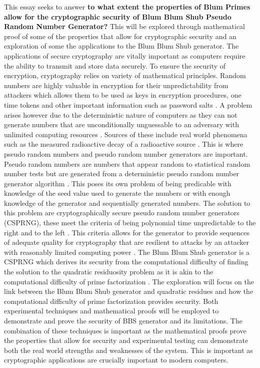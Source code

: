 \documentclass{article}
\begin{document}
This essay seeks to answer \textbf{to what extent the properties of Blum Primes allow for the cryptographic security of Blum Blum Shub Pseudo Random Number Generator?} This will be explored through mathematical proof of some of the properties that allow for cryptographic security and an exploration of some the applications to the Blum Blum Shub generator. The applications of secure cryptography are vitally important as computers require the ability to transmit and store data securely. To ensure the security of encryption, cryptography relies on variety of mathematical principles. Random numbers are highly valuable in encryption for their unpredictability from attackers which allows them to be used as keys in encryption procedures, one time tokens and other important information such as password salts \cite{design2010}. A problem arises however due to the deterministic nature of computers as they can not generate numbers that are unconditionally unguessable to an adversary with unlimited computing resources \cite{design2010} \cite{Blum1986}. Sources of these include real world phenomena such as the measured radioactive decay of a radioactive source \cite{design2010}. This is where pseudo random numbers and pseudo random number generators are important. Pseudo random numbers are numbers that appear random to statistical random number tests but are generated from a deterministic pseudo random number generator algorithm \cite{Blum1986} \cite{design2010}. This poses its own problem of being predicable with knowledge of the seed value used to generate the numbers or with enough knowledge of the generator and sequentially generated numbers. The solution to this problem are cryptographically secure pseudo random number generators (CSPRNG), these meet the criteria of being polynomial time unpredictable to the right and to the left \cite{Blum1986}. This criteria allows for the generator to provide sequences of adequate quality for cryptography that are resilient to attacks by an attacker with reasonably limited computing power \cite{Blum1986}. The Blum Blum Shub generator is a CSPRNG which derives its security from the computational difficulty of finding the solution to the quadratic residuosity problem as it is akin to the computational difficulty of prime factorization \cite{Blum1986}. The exploration will focus on the link between the Blum Blum Shub generator and quadratic residues and how the computational difficulty of prime factorization provides security. Both experimental techniques and mathematical proofs will be employed to demonstrate and prove the security of BBS generator and its limitations. The combination of these techniques is important as the mathematical proofs prove the properties that allow for security and experimental testing can demonstrate both the real world strengths and weaknesses of the system. This is important as cryptographic applications are crucially important to modern computers.
\end{document}
